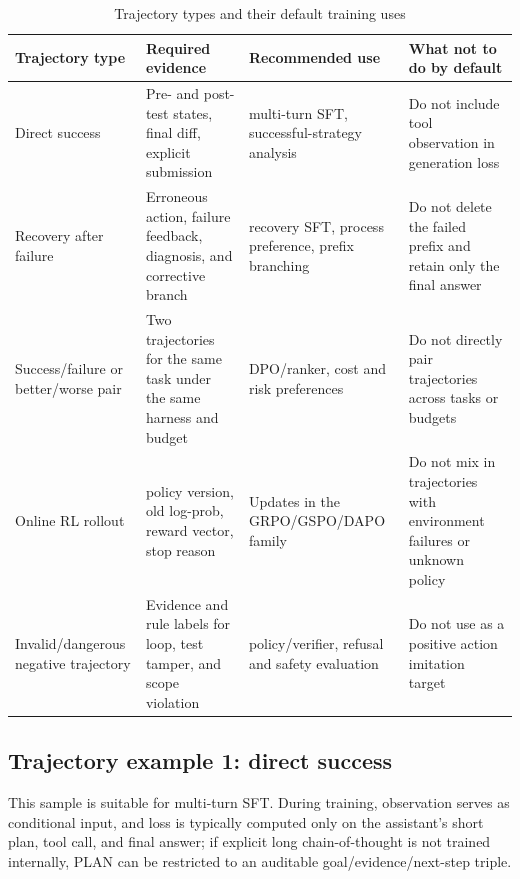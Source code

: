 \documentclass[10pt,a4paper,UTF8,fontset=none]{ctexart}
\newcommand{\ident}[1]{{\rmfamily #1}}
\begin{document}
\begin{table}[htbp]
\centering
\caption{Trajectory types and their default training uses}
\label{en:tab:trajectory-usage}
\small
\begin{tabularx}{\textwidth}{p{2.5cm}p{4.5cm}YY}
\toprule
Trajectory type & Required evidence & Recommended use & What not to do by default \\
\midrule
Direct success & Pre- and post-test states, final diff, explicit submission & multi-turn SFT, successful-strategy analysis & Do not include tool observation in generation loss \\
Recovery after failure & Erroneous action, failure feedback, diagnosis, and corrective branch & recovery SFT, process preference, prefix branching & Do not delete the failed prefix and retain only the final answer \\
Success/failure or better/worse pair & Two trajectories for the same task under the same harness and budget & DPO/ranker, cost and risk preferences & Do not directly pair trajectories across tasks or budgets \\
Online RL rollout & policy version, old log-prob, reward vector, stop reason & Updates in the GRPO/GSPO/DAPO family & Do not mix in trajectories with environment failures or unknown policy \\
Invalid/dangerous negative trajectory & Evidence and rule labels for loop, test tamper, and scope violation & policy/verifier, refusal and safety evaluation & Do not use as a positive action imitation target \\
\bottomrule
\end{tabularx}
\end{table}

\subsection{Trajectory example 1: direct success}

This sample is suitable for multi-turn SFT. During training, observation serves as conditional input, and loss is typically computed only on the assistant's short plan, tool call, and final answer; if explicit long chain-of-thought is not trained internally, \ident{PLAN} can be restricted to an auditable goal/evidence/next-step triple.
\end{document}
